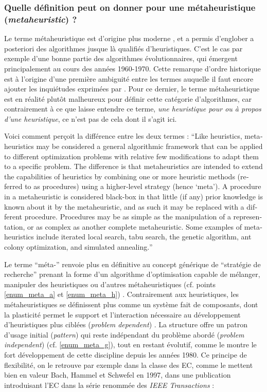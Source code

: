 \subsubsection{Quelle définition peut on donner pour une métaheuristique (\textit{metaheuristic}) ?}
\label{sssec:metaheuristique}

Le terme métaheuristique est d'origine plus moderne \autocite{Glover1986}, et a permis d'englober a posteriori des algorithmes jusque là qualifiés d'heuristiques. C'est le cas par exemple d'une bonne partie des algorithmes évolutionnaires, qui émergent principalement au cours des années 1960-1970. Cette remarque d'ordre historique est à l'origine d'une première ambiguité entre les termes auquelle il faut encore ajouter les inquiétudes exprimées par \textcite{Luke2013}. Pour ce dernier, le terme métaheuristique est en réalité plutôt malheureux pour définir cette catégorie d'algorithmes, car contrairement à ce que laisse entendre ce terme, \textit{une heuristique pour ou à propos d'une heuristique}, ce n'est pas de cela dont il s'agit ici.

Voici comment \textcite[8]{Brownlee2012} perçoit la différence entre les deux termes : \foreignquote{english}{Like heuristics, metaheuristics may be considered a general algorithmic framework that can be applied to different optimization problems with relative few modifications to adapt them to a specific problem. The difference is that metaheuristics are intended to extend the capabilities of heuristics by combining one or more heuristic methods (referred to as procedures) using a higher-level strategy (hence ‘meta’). A procedure in a metaheuristic is considered black-box in that little (if any) prior knowledge is known about it by the metaheuristic, and as such it may be replaced with a different procedure. Procedures may be as simple as the manipulation of a representation, or as complex as another complete metaheuristic. Some examples of metaheuristics include iterated local search, tabu search, the genetic algorithm, ant colony optimization, and simulated annealing.}

Le terme \enquote{méta-} renvoie plus en définitive au concept générique de \enquote{stratégie de recherche} prenant la forme d'un algorithme d'optimisation capable de mélanger, manipuler des heuristiques ou d'autres métaheuristiques (cf. points \ref{enum_meta_a} et \ref{enum_meta_h}) . Contrairement aux heuristiques, les métaheuristiques se définissent plus comme un système fait de composants, dont la plasticité permet le support et l'interaction nécessaire au développement d'heuristiques plus ciblées (\textit{problem dependent}) . La structure offre un patron d'usage initial (\textit{pattern}) qui reste indépendant du problème abordé (\textit{problem independent}) (cf. \ref{enum_meta_g}), tout en restant évolutif, comme le montre le fort développement de cette discipline depuis les années 1980. Ce principe de flexibilité, on le retrouve par exemple dans la classe des EC, comme le mettent bien en valeur Bach, Hammel et Schwefel en 1997, dans une publication introduisant l'EC dans la série renommée des \textit{IEEE Transactions} :

